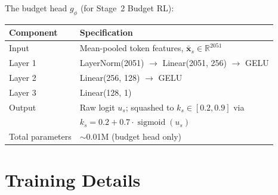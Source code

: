\documentclass[letterpaper]{article}
\begin{document}
The budget head $g_\phi$ (for Stage~2 Budget RL):
\begin{center}
\begin{tabular}{@{}ll@{}}
\toprule
Component & Specification \\
\midrule
Input & Mean-pooled token features, $\bar{\mathbf{x}}_s \in \mathbb{R}^{2051}$ \\
Layer 1 & LayerNorm(2051) $\to$ Linear(2051, 256) $\to$ GELU \\
Layer 2 & Linear(256, 128) $\to$ GELU \\
Layer 3 & Linear(128, 1) \\
Output & Raw logit $u_s$; squashed to $k_s \in [0.2, 0.9]$ via \\
       & $k_s = 0.2 + 0.7 \cdot \operatorname{sigmoid}(u_s)$ \\
Total parameters & $\sim$0.01M (budget head only) \\
\bottomrule
\end{tabular}
\end{center}

\section{Training Details}
\label{sec:training}
\end{document}
